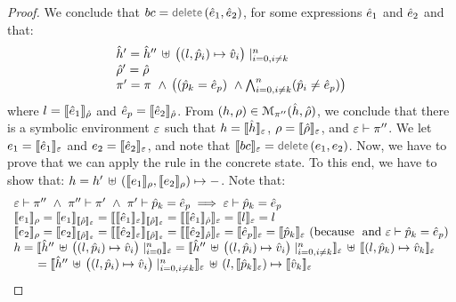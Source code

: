 \begin{proof}
\noindent{}
We conclude that $\bcmd = \jsildelete(\sexpr_1, \sexpr_2)$, for some expressions $\sexpr_1$ and $\sexpr_2$
and that: 
$$
\begin{array}{l}
\sheap' = \sheap'' \, \uplus \,  \big((\loc, \sexprp_i) \mapsto \sexprv_i\big)\mid_{i = 0, i \neq k}^n
\\ 
\sstore' = \sstore
\\ 
 \pc' = \pc \ \wedge \, \big( (\sexprp_k = \sexpr_p) \ \wedge \bigwedge_{i = 0, i \neq k}^n (\sexprp_i \neq \sexpr_p) \big)
\end{array}
$$
where $\loc = \symbeval{\sexpr_1}{\sstore}$ and $\sexpr_p = \symbeval{\sexpr_2}{\sstore}$.
From $(\heap, \store) \in \smodels{\sheap, \sstore}{\pc''}$, we conclude that there is a symbolic environment
$\senv$ such that $\heap = \semexpr{\sheap}{\senv}$, $\store = \semexpr{\sstore}{\senv}$, and 
$\senv \vdash \pc''$. We let $\jsilexpr_1 = \symbeval{\sexpr_1}{\senv}$ and 
$\jsilexpr_2 = \symbeval{\sexpr_2}{\senv}$, and note that $\symbeval{\bcmd}{\senv} = \jsildelete(\jsilexpr_1, \jsilexpr_2)$.
Now, we have to prove that we can apply the  rule in the concrete state.
To this end, we have to show that:
$\heap = \heap' \dunion \hcell{\symbeval{\jsilexpr_1}{\store}}{\symbeval{\jsilexpr_2}{\store}}{-}$. 
Note that: 
$$
\begin{array}{l}
%
\senv \vdash \pc'' \ \wedge \ \pc'' \vdash \pc' \ \wedge \ \pc' \vdash \sexprp_k = \sexpr_p \implies \senv \vdash \sexprp_k = \sexpr_p \\
%
 \symbeval{\jsilexpr_1}{\store} = \symbeval{\jsilexpr_1}{\symbeval{\sstore}{\senv}} = \symbeval{\symbeval{\sexpr_1}{\senv}}{\symbeval{\sstore}{\senv}} = \symbeval{\symbeval{\sexpr_1}{\sstore}}{\senv} 
    = \symbeval{\loc}{\senv} = \loc \\ 
  \symbeval{\jsilexpr_2}{\store}  = \symbeval{\jsilexpr_2}{\semexpr{\sstore}{\senv}} =  \symbeval{\symbeval{\sexpr_2}{\senv}}{\symbeval{\sstore}{\senv}} = \symbeval{\symbeval{\sexpr_2}{\sstore}}{\senv}
   =  \symbeval{\sexpr_p}{\senv} = \symbeval{\sexprp_k}{\senv}  \text{ (because $$ and $\senv \vdash \sexprp_k = \sexpr_p$)} \\
 \heap = \semexpr{\sheap'' \, \uplus \, \big((l, \sexprp_i) \mapsto \sexprv_i\big)\mid_{i = 0}^n}{\senv} 
       =  \semexpr{\sheap'' \, \uplus \, \big((l, \sexprp_i) \mapsto \sexprv_i\big)\mid_{i = 0, i \neq k}^n}{\senv} \dunion \semexpr{(l, \sexprp_k) \mapsto \sexprv_k}{\senv} \\
         \qquad = \semexpr{\sheap'' \, \uplus \, \big((l, \sexprp_i) \mapsto \sexprv_i\big)\mid_{i = 0, i \neq k}^n}{\senv} \dunion (l, \semexpr{\sexprp_k}{\senv}) \mapsto \semexpr{\sexprv_k}{\senv}  \\ 

\end{array}$$
\end{proof}
